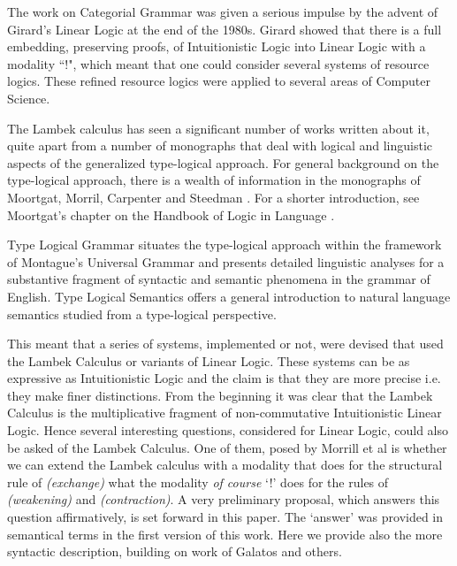 \documentclass{article}
\begin{document}
The work on Categorial Grammar was given a serious impulse by the
advent of Girard's Linear Logic at the end of the 1980s.  Girard
showed that there is a full embedding, preserving proofs, of
Intuitionistic Logic into Linear Logic with a modality ``!", which
meant that one could consider several systems of resource
logics. These refined resource logics were applied to several areas of
Computer Science.

The Lambek calculus has seen a significant number of works written
about it, quite apart from a number of monographs that deal with
logical and linguistic aspects of the generalized type-logical
approach.  For general background on the type-logical approach, there
is a wealth of information in the monographs of Moortgat, Morril,
Carpenter and Steedman \cite{?}. For a shorter introduction, see
Moortgat's chapter on the Handbook of Logic in Language \cite{?}.

Type Logical Grammar situates the type-logical approach within the
framework of Montague's Universal Grammar and presents detailed
linguistic analyses for a substantive fragment of syntactic and
semantic phenomena in the grammar of English.  Type Logical Semantics
offers a general introduction to natural language semantics studied
from a type-logical perspective.



This meant that a series of systems, implemented or not, were devised
that used the Lambek Calculus or variants of Linear Logic. These
systems can be as expressive as Intuitionistic Logic and the claim is
that they are more precise i.e. they make finer distinctions.  From
the beginning it was clear that the Lambek Calculus is the
multiplicative fragment of non-commutative Intuitionistic Linear
Logic.  Hence several interesting questions, considered for Linear
Logic, could also be asked of the Lambek Calculus.  One of them, posed
by Morrill et al is whether we can extend the Lambek calculus with a
modality that does for the structural rule of \textit{(exchange)} what
the modality \textit{of course} `!' does for the rules of
\textit{(weakening)} and \textit{(contraction)}.  A very preliminary
proposal, which answers this question affirmatively, is set forward in
this paper. The `answer' was provided in semantical terms in the first
version of this work. Here we provide also the more syntactic
description, building on work of Galatos and others.
\end{document}
